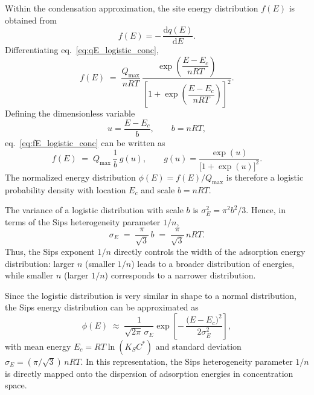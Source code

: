 \documentclass[12pt]{article}
\begin{document}
	Within the condensation approximation, the site energy distribution
	\(f(E)\) is obtained from
	\begin{equation}
		f(E) = -\,\frac{\mathrm{d}q(E)}{\mathrm{d}E}.
	\end{equation}
	Differentiating eq.~\eqref{eq:qE_logistic_conc},
	\begin{equation}
		f(E)
		\;=\;
		\frac{Q_{\max}}{nRT}\,
		\frac{\exp\!\left(\dfrac{E - E_c}{nRT}\right)}
		{\left[1 + \exp\!\left(\dfrac{E - E_c}{nRT}\right)\right]^{2}}.
		\label{eq:fE_logistic_conc}
	\end{equation}
	Defining the dimensionless variable
	\begin{equation}
		u = \frac{E - E_c}{b},
		\qquad
		b = nRT,
	\end{equation}
	eq.~\eqref{eq:fE_logistic_conc} can be written as
	\begin{equation}
		f(E)
		\;=\;
		Q_{\max}\,\frac{1}{b}\,g(u),
		\qquad
		g(u) = \frac{\exp(u)}{\bigl[1 + \exp(u)\bigr]^{2}}.
	\end{equation}
	The normalized energy distribution
	\(\phi(E) = f(E)/Q_{\max}\) is therefore a logistic probability density
	with location \(E_c\) and scale \(b = nRT\).
	
	The variance of a logistic distribution with scale \(b\) is
	\(\sigma_E^{2} = \pi^{2} b^{2} / 3\). Hence, in terms of the Sips
	heterogeneity parameter \(1/n\),
	\begin{equation}
		\sigma_E
		\;=\;
		\frac{\pi}{\sqrt{3}}\,b
		\;=\;
		\frac{\pi}{\sqrt{3}}\,nRT.
		\label{eq:sigmaE_n_conc}
	\end{equation}
	Thus, the Sips exponent \(1/n\) directly controls the width of the
	adsorption energy distribution: larger \(n\) (smaller \(1/n\)) leads
	to a broader distribution of energies, while smaller \(n\) (larger
	\(1/n\)) corresponds to a narrower distribution.
	
	Since the logistic distribution is very similar in shape to a normal
	distribution, the Sips energy distribution can be approximated as
	\begin{equation}
		\phi(E)
		\;\approx\;
		\frac{1}{\sqrt{2\pi}\,\sigma_E}
		\exp\!\left[
		-\,\frac{\bigl(E - E_c\bigr)^{2}}{2\sigma_E^{2}}
		\right],
	\end{equation}
	with mean energy \(E_c = RT \ln(K_S C^{\ast})\) and standard deviation
	\(\sigma_E = (\pi/\sqrt{3})\,nRT\). In this representation, the Sips
	heterogeneity parameter \(1/n\) is directly mapped onto the dispersion
	of adsorption energies in concentration space.
	
\end{document}
